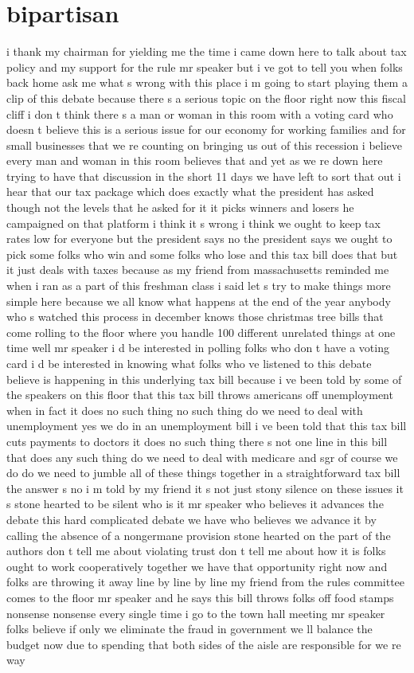 \documentclass{article}
\begin{document}
\section*{bipartisan}
i thank my chairman for yielding me the time i came down here to talk about tax policy and my support for the rule mr speaker but i ve got to tell you when folks back home ask me what s wrong with this place i m going to start playing them a clip of this debate because there s a serious topic on the floor right now this fiscal cliff i don t think there s a man or woman in this room with a voting card who doesn t believe this is a serious issue for our economy for working families and for small businesses that we re counting on bringing us out of this recession i believe every man and woman in this room believes that and yet as we re down here trying to have that discussion in the short 11 days we have left to sort that out i hear that our tax package which does exactly what the president has asked though not the levels that he asked for it it picks winners and losers he campaigned on that platform i think it s wrong i think we ought to keep tax rates low for everyone but the president says no the president says we ought to pick some folks who win and some folks who lose and this tax bill does that but it just deals with taxes because as my friend from massachusetts reminded me when i ran as a part of this freshman class i said let s try to make things more simple here because we all know what happens at the end of the year anybody who s watched this process in december knows those christmas tree bills that come rolling to the floor where you handle 100 different unrelated things at one time well mr speaker i d be interested in polling folks who don t have a voting card i d be interested in knowing what folks who ve listened to this debate believe is happening in this underlying tax bill because i ve been told by some of the speakers on this floor that this tax bill throws americans off unemployment when in fact it does no such thing no such thing do we need to deal with unemployment yes we do in an unemployment bill i ve been told that this tax bill cuts payments to doctors it does no such thing there s not one line in this bill that does any such thing do we need to deal with medicare and sgr of course we do do we need to jumble all of these things together in a straightforward tax bill the answer s no i m told by my friend it s not just stony silence on these issues it s stone hearted to be silent who is it mr speaker who believes it advances the debate this hard complicated debate we have who believes we advance it by calling the absence of a nongermane provision stone hearted on the part of the authors don t tell me about violating trust don t tell me about how it is folks ought to work cooperatively together we have that opportunity right now and folks are throwing it away line by line by line my friend from the rules committee comes to the floor mr speaker and he says this bill throws folks off food stamps nonsense nonsense every single time i go to the town hall meeting mr speaker folks believe if only we eliminate the fraud in government we ll balance the budget now due to spending that both sides of the aisle are responsible for we re way 
\end{document}
